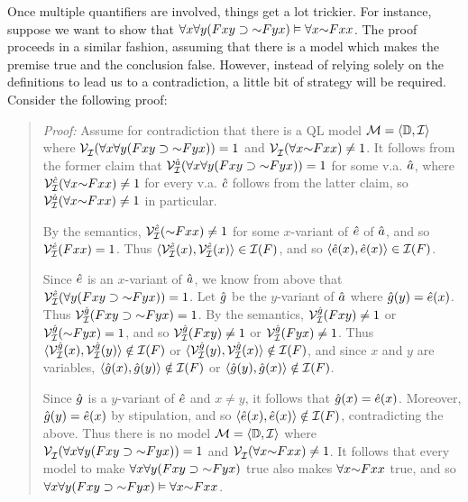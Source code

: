 Once multiple quantifiers are involved, things get a lot trickier.
For instance, suppose we want to show that $\qt{\forall}{x}\qt{\forall}{y}(Fxy \eif \enot Fyx) \models \qt{\forall}{x}\enot Fxx$.
The proof proceeds in a similar fashion, assuming that there is a model which makes the premise true and the conclusion false.
However, instead of relying solely on the definitions to lead us to a contradiction, a little bit of strategy will be required.
Consider the following proof:

\begin{quote}
\label{allmodels3}
  \textit{Proof:}
  Assume for contradiction that there is a QL model $\mathcal{M}=\langle\mathbb{D},\mathcal{I}\rangle$ where $\VV{\I}{}(\qt{\forall}{x}\qt{\forall}{y}(Fxy \eif \enot Fyx))=1$ and $\VV{\I}{}(\qt{\forall}{x}\enot Fxx)\neq 1$. 
  It follows from the former claim that $\VV{\I}{\va{a}}(\qt{\forall}{x}\qt{\forall}{y}(Fxy \eif \enot Fyx))=1$ for some v.a. $\hat{a}$, where $\VV{\I}{\va{c}}(\qt{\forall}{x}\enot Fxx)\neq 1$ for every v.a. $\hat{c}$ follows from the latter claim, so $\VV{\I}{\va{a}}(\qt{\forall}{x}\enot Fxx)\neq 1$ in particular.

  By the semantics, $\VV{\I}{\va{e}}(\enot Fxx)\neq 1$ for some $x$-variant of $\hat{e}$ of $\hat{a}$, and so $\mathcal{V}_{\mathcal{I}}^{\hat{e}}(Fxx)=1$.
  Thus $\langle\mathcal{V}_{\mathcal{I}}^{\hat{e}}(x),\mathcal{V}_{\mathcal{I}}^{\hat{e}}(x)\rangle\in\mathcal{I}(F)$, and so $\langle\hat{e}(x),\hat{e}(x)\rangle\in\mathcal{I}(F)$.

  Since $\hat{e}$ is an $x$-variant of $\hat{a}$, we know from above that $\VV{\I}{\va{e}}(\qt{\forall}{y}(Fxy \eif \enot Fyx))=1$.
  Let $\hat{g}$ be the $y$-variant of $\hat{a}$ where $\hat{g}(y)=\hat{e}(x)$.
  Thus $\VV{\I}{\va{g}}(Fxy \eif \enot Fyx)=1$.
  By the semantics, $\mathcal{V}_{\mathcal{I}}^{\hat{g}}(Fxy)\neq 1$ or $\VV{\I}{\va{g}}(\enot Fyx)=1$, and so $\mathcal{V}_{\mathcal{I}}^{\hat{g}}(Fxy)\neq 1$ or $\mathcal{V}_{\mathcal{I}}^{\hat{g}}(Fyx)\neq 1$.
  Thus $\langle\mathcal{V}_{\mathcal{I}}^{\hat{g}}(x),\mathcal{V}_{\mathcal{I}}^{\hat{g}}(y)\rangle\notin\mathcal{I}(F)$ or $\langle\mathcal{V}_{\mathcal{I}}^{\hat{g}}(y),\mathcal{V}_{\mathcal{I}}^{\hat{g}}(x)\rangle\notin\mathcal{I}(F)$, and since $x$ and $y$ are variables, $\langle\hat{g}(x),\hat{g}(y)\rangle\notin\mathcal{I}(F)$ or $\langle\hat{g}(y),\hat{g}(x)\rangle\notin\mathcal{I}(F)$.

  Since $\hat{g}$ is a $y$-variant of $\hat{e}$ and $x\neq y$, it follows that $\hat{g}(x)=\hat{e}(x)$.
  Moreover, $\hat{g}(y)=\hat{e}(x)$ by stipulation, and so $\langle\hat{e}(x),\hat{e}(x)\rangle\notin\mathcal{I}(F)$, contradicting the above.
  Thus there is no model $\mathcal{M}=\langle\mathbb{D},\mathcal{I}\rangle$ where $\VV{\I}{}(\qt{\forall}{x}\qt{\forall}{y}(Fxy \eif \enot Fyx))=1$ and $\VV{\I}{}(\qt{\forall}{x}\enot Fxx)\neq 1$. 
  It follows that every model to make $\qt{\forall}{x}\qt{\forall}{y}(Fxy \eif \enot Fyx)$ true also makes $\qt{\forall}{x}\enot Fxx$ true, and so $\qt{\forall}{x}\qt{\forall}{y}(Fxy \eif \enot Fyx) \models \qt{\forall}{x}\enot Fxx$.

\end{quote}

